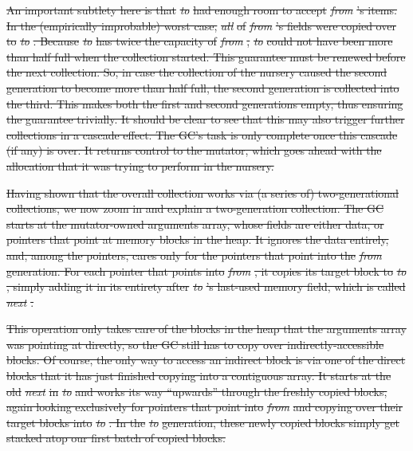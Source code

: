 \documentclass[acmsmall,screen]{acmart}  %
\providecommand{\DIFdel}[1]{{\protect\color{red}\sout{#1}}}                      %
\begin{document}
\DIFdel{An important subtlety here is that }\emph{\DIFdel{to}} %
\DIFdel{had enough 
room to accept }\emph{\DIFdel{from}}%
\DIFdel{'s items. 
In the (empirically improbable) worst case, 
}\emph{\DIFdel{all}} %
\DIFdel{of }\emph{\DIFdel{from}}%
\DIFdel{'s fields were copied over to }\emph{\DIFdel{to}}%
\DIFdel{.
Because }\emph{\DIFdel{to}} %
\DIFdel{has twice the capacity of }\emph{\DIFdel{from}}%
\DIFdel{,
}\emph{\DIFdel{to}} %
\DIFdel{could not have been more than half full when 
the collection started.
This guarantee must be renewed before the next collection. 
So, in case the collection of the nursery caused
the second generation to become more than half full, 
the second generation is collected into the third. This makes 
both the first and second generations empty, thus ensuring 
the guarantee trivially. It should be 
clear to see that this may also trigger further collections in 
a cascade effect. The GC's task is only complete once this 
cascade (if any) is over. It returns control to the mutator,
which goes ahead with 
the allocation that it was trying to perform in the nursery.
}%

\DIFdel{Having shown that the overall collection 
works via (a series of) two-generational collections, 
we now zoom in and explain a two-generation collection. The GC starts at the mutator-owned arguments array, whose fields
are either data, or pointers that point at memory blocks in the 
heap. It ignores the data entirely, and, among the pointers, 
cares only for the pointers that point into the }\emph{\DIFdel{from}} %
\DIFdel{generation. 
For each pointer that points into }\emph{\DIFdel{from}}%
\DIFdel{, it copies its
target block to }\emph{\DIFdel{to}}%
\DIFdel{, simply adding it in its entirety 
after }\emph{\DIFdel{to}}%
\DIFdel{'s last-used memory field, which is called }\emph{\DIFdel{next}}%
\DIFdel{. 
}%

\DIFdel{This operation only takes care of the blocks in the heap that 
the arguments array was pointing at directly, so the GC still has to copy 
over indirectly-accessible blocks. Of course, the only way to 
access an indirect 
block is via one of the direct blocks that it has
just finished copying into a contiguous array. 
It starts at the old }\emph{\DIFdel{next}} %
\DIFdel{in }\emph{\DIFdel{to}}
\DIFdel{and works its way ``upwards'' through the
freshly copied blocks, 
again looking exclusively for pointers that point into }\emph{\DIFdel{from}}
\DIFdel{and copying over their target blocks into }\emph{\DIFdel{to}}%
\DIFdel{. 
In the }\emph{\DIFdel{to}} %
\DIFdel{generation, these newly copied blocks 
simply get stacked atop our first batch of copied blocks.
}%
\end{document}
